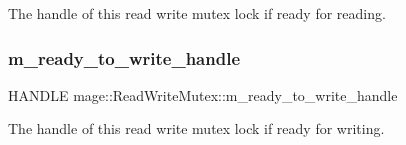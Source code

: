 The handle of this read write mutex lock if ready for reading. \hypertarget{classmage_1_1_read_write_mutex_a9498ef85b52486342ba657f34369f89e}{}\label{classmage_1_1_read_write_mutex_a9498ef85b52486342ba657f34369f89e} 
\subsubsection{\texorpdfstring{m\+\_\+ready\+\_\+to\+\_\+write\+\_\+handle}{m\_ready\_to\_write\_handle}}
{\footnotesize\ttfamily H\+A\+N\+D\+LE mage\+::\+Read\+Write\+Mutex\+::m\+\_\+ready\+\_\+to\+\_\+write\+\_\+handle\hspace{0.3cm}{\ttfamily [private]}}

The handle of this read write mutex lock if ready for writing. 